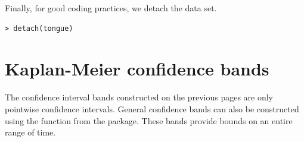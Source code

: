 \documentclass[article]{jss}
\begin{document}
Finally, for good coding practices, we detach the  data set.
\begin{verbatim}
> detach(tongue)
\end{verbatim}



\pagebreak

\section[Confidence bands]{Kaplan-Meier confidence bands}
\label{confBands}

The confidence interval bands constructed on the previous pages are only pointwise confidence intervals. General confidence bands can also be constructed using the  function from the  package. These bands provide bounds on an entire range of time. %
\end{document}
